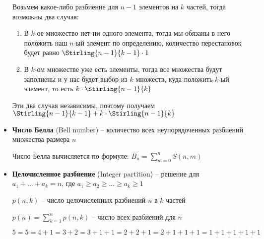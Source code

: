 \documentclass[12pt]{article}
\begin{document}
\begin{itemize}
        Возьмем какое-либо разбиение для $n - 1$ элементов на $k$ частей, тогда возможны два случая:

        \begin{enumerate}
            \item В $k$-ое множество нет ни одного элемента, тогда мы обязаны в него положить наш $n$-ый элемент по определению,
            количество перестановок будет равно $\Stirling{n - 1}{k - 1} \cdot 1$

            \item В $k$-ом множестве уже есть элементы, тогда все множества будут заполнены и у нас будет выбор из $k$ множеств,
            куда положить $k$-ый элемент, то есть $k \cdot \Stirling{n - 1}{k}$
        \end{enumerate}

        Эти два случая независимы, поэтому получаем $\Stirling{n - 1}{k - 1} + k \cdot \Stirling{n - 1}{k}$

        \mediumvspace

        \item \textbf{Число Белла} (Bell number) -- количество всех неупорядоченных разбиений множества размера $n$

        Число Белла вычисляется по формуле: $B_n = \sum_{m=0}^n S(n, m)$

        \mediumvspace

        \hypertarget{integerpartition}{}

        \item \textbf{Целочисленное разбиение} (Integer partition) -- решение для $a_1 + \dots + a_k = n$, где $a_1 \geq a_2 \geq \dots \geq a_k \geq 1$

        $p(n, k)$ -- число целочисленных разбиений $n$ в $k$ частей

        $p(n) = \sum_{k = 1}^n p(n, k)$ -- число всех разбиений для $n$

        \Ex $5 = 5 = 4 + 1 = 3 + 2 = 3 + 1 + 1 = 2 + 2 + 1 = 2 + 1 + 1 + 1 = 1 + 1 + 1 + 1 + 1$

        \mediumvspace

    \end{itemize}
\end{document}
